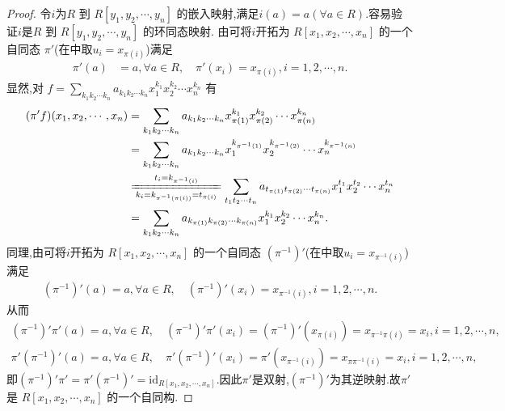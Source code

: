\documentclass[../../main.tex]{subfiles}%
\begin{document}
\begin{proof}
令$i$为\( R \) 到 \( R[y_1, y_2, \cdots, y_n] \) 的嵌入映射,满足\( i(a) = a (\forall a \in R) \).容易验证$i$是\( R \) 到 \( R[y_1, y_2, \cdots, y_n] \) 的环同态映射.
由可将$i$开拓为 \( R[x_1, x_2, \cdots, x_n] \) 的一个自同态 \( \pi' \)(在中取$u_i=x_{\pi(i)}$)满足
\begin{align*}
\pi'(a) &= a, \forall a \in R, \quad \pi'(x_i) = x_{\pi(i)}, i = 1, 2, \cdots, n.
\end{align*}
显然,对 \( f = \sum\limits_{k_1k_2\cdots k_n} a_{k_1k_2\cdots k_n} x_1^{k_1} x_2^{k_2} \cdots x_n^{k_n} \) 有
\begin{align*}
(\pi ' f)(x_1,x_2,\cdots ,x_n)&=\sum_{k_1k_2\cdots k_n}{a_{k_1k_2\cdots k_n}x_{\pi (1)}^{k_1}x_{\pi (2)}^{k_2}}\cdots x_{\pi (n)}^{k_n}
\\
&=\sum_{k_1k_2\cdots k_n}{a_{k_1k_2\cdots k_n}x_{1}^{k_{\pi ^{-1}(1)}}x_{2}^{k_{\pi ^{-1}(2)}}}\cdots x_{n}^{k_{\pi ^{-1}(n)}}
\\
&\xlongequal[k_i=k_{\pi ^{-1}\left( \pi \left( i \right) \right)}=t_{\pi \left( i \right)}]{t_i=k_{\pi ^{-1}\left( i \right)}}\sum_{t_1t_2\cdots t_n}{a_{t_{\pi (1)}t_{\pi (2)}\cdots t_{\pi (n)}}x_{1}^{t_1}x_{2}^{t_2}}\cdots x_{n}^{t_n}
\\
&=\sum_{k_1k_2\cdots k_n}{a_{k_{\pi (1)}k_{\pi (2)}\cdots k_{\pi (n)}}x_{1}^{k_1}x_{2}^{k_2}}\cdots x_{n}^{k_n}.
\end{align*}
同理,由可将$i$开拓为 \( R[x_1, x_2, \cdots, x_n] \) 的一个自同态 \( \left( \pi ^{-1} \right)' \)(在中取$u_i=x_{\pi^{-1}(i)}$)满足
\begin{align*}
\left( \pi ^{-1} \right)' (a)=a,\forall a\in R,\quad \left( \pi ^{-1} \right)' (x_i)=x_{\pi ^{-1}(i)},i=1,2,\cdots ,n.
\end{align*}
从而
\begin{gather*}
\left( \pi ^{-1} \right) ' \pi ' \left( a \right) =a,\forall a\in R,\quad \left( \pi ^{-1} \right) ' \pi ' (x_i)=\left( \pi ^{-1} \right) ' \left( x_{\pi (i)} \right) =x_{\pi ^{-1}\pi (i)}=x_i,i=1,2,\cdots ,n,
\\
\pi ' \left( \pi ^{-1} \right) ' \left( a \right) =a,\forall a\in R,\quad \pi ' \left( \pi ^{-1} \right) ' (x_i)=\pi ' \left( x_{\pi ^{-1}(i)} \right) =x_{\pi \pi ^{-1}(i)}=x_i,i=1,2,\cdots ,n,
\end{gather*}
即$\left( \pi ^{-1} \right)' \pi' =\pi' \left( \pi ^{-1} \right)' =\mathrm{id}_{R[x_1,x_2,\cdots ,x_n]}.$因此$\pi'$是双射,$(\pi^{-1})'$为其逆映射.故\( \pi' \) 是 \( R[x_1, x_2, \cdots, x_n] \) 的一个自同构.



\end{proof}
\end{document}

